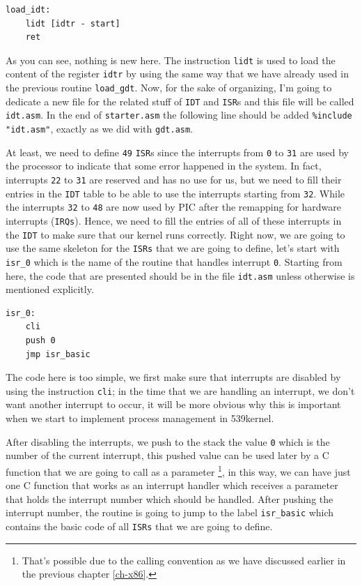 \begin{lstlisting}
load_idt:
    lidt [idtr - start]
    ret
\end{lstlisting}

As you can see, nothing is new here. The instruction \lstinline!lidt! is
used to load the content of the register \lstinline!idtr! by using the
same way that we have already used in the previous routine
\lstinline!load_gdt!. Now, for the sake of organizing, I'm going to
dedicate a new file for the related stuff of \lstinline!IDT! and
\lstinline!ISR!s and this file will be called \lstinline!idt.asm!. In
the end of \lstinline!starter.asm! the following line should be added
\lstinline!%include "idt.asm"!, exactly as we did with
\lstinline!gdt.asm!.

At least, we need to define \lstinline!49! \lstinline!ISR!s since the
interrupts from \lstinline!0! to \lstinline!31! are used by the
processor to indicate that some error happened in the system. In fact,
interrupts \lstinline!22! to \lstinline!31! are reserved and has no use
for us, but we need to fill their entries in the \lstinline!IDT! table
to be able to use the interrupts starting from \lstinline!32!. While the
interrupts \lstinline!32! to \lstinline!48! are now used by PIC after
the remapping for hardware interrupts (\lstinline!IRQs!). Hence, we need
to fill the entries of all of these interrupts in the \lstinline!IDT! to
make sure that our kernel runs correctly. Right now, we are going to use
the same skeleton for the \lstinline!ISRs! that we are going to define,
let's start with \lstinline!isr_0! which is the name of the routine that
handles interrupt \lstinline!0!. Starting from here, the code that are
presented should be in the file \lstinline!idt.asm! unless otherwise is
mentioned explicitly.

\begin{lstlisting}
isr_0:
    cli
    push 0
    jmp isr_basic
\end{lstlisting}

The code here is too simple, we first make sure that interrupts are
disabled by using the instruction \lstinline!cli!; in the time that we
are handling an interrupt, we don't want another interrupt to occur, it
will be more obvious why this is important when we start to implement
process management in 539kernel.

After disabling the interrupts, we push to the stack the value
\lstinline!0! which is the number of the current interrupt, this pushed
value can be used later by a C function that we are going to call as a
parameter \footnote{That's possible due to the calling convention as we
  have discussed earlier in the previous chapter \ref{ch-x86}.}, in this
way, we can have just one C function that works as an interrupt handler
which receives a parameter that holds the interrupt number which should
be handled. After pushing the interrupt number, the routine is going to
jump to the label \lstinline!isr_basic! which contains the basic code of
all \lstinline!ISRs! that we are going to define.

